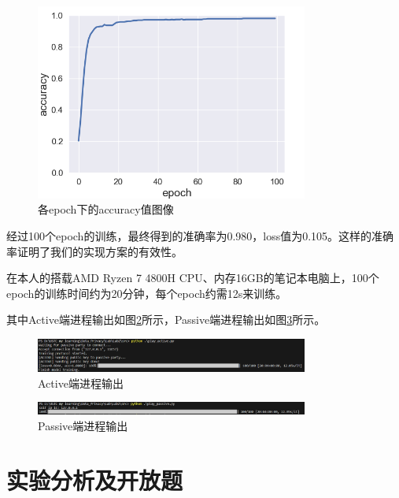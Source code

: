 \documentclass[twoside,11pt]{article}
\begin{document}
\begin{figure}[htbp]
    \centering
    \includegraphics[width=0.8\textwidth]{pic/accuracy-plot.png}
    \caption{各epoch下的accuracy值图像}
    \label{fig:acc}
\end{figure}

经过100个epoch的训练，最终得到的准确率为0.980，loss值为0.105。这样的准确率证明了我们的实现方案的有效性。

在本人的搭载AMD Ryzen 7 4800H CPU、内存16GB的笔记本电脑上，100个epoch的训练时间约为20分钟，每个epoch约需12s来训练。

其中Active端进程输出如图\ref{fig:active}所示，Passive端进程输出如图\ref{fig:passive}所示。

\begin{figure}[htbp]
    \centering
    \includegraphics[width=0.8\textwidth]{pic/active-output.png}
    \caption{Active端进程输出}
    \label{fig:active}
\end{figure}

\begin{figure}[htbp]
    \centering
    \includegraphics[width=0.8\textwidth]{pic/passive-output.png}
    \caption{Passive端进程输出}
    \label{fig:passive}
\end{figure}


\section{实验分析及开放题}
\end{document}
